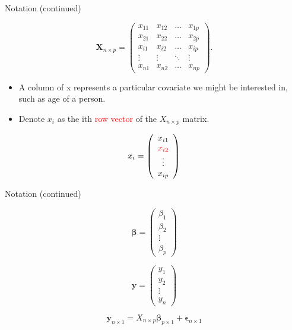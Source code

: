\documentclass[
  ignorenonframetext,
]{beamer}
\newcommand{\by}   {\bm{y}}
\newcommand{\bbeta}{\bm{\beta}}
\begin{document}
\begin{frame}{Notation (continued)}
\protect\hypertarget{notation-continued}{}

\[\bm{X}_{n \times p} = 
\left( \begin{array}{cccc}
x_{11} & x_{12} & \ldots&  x_{1p}\\
x_{21} & x_{22} & \ldots& x_{2p} \\
x_{i1} & x_{i2} & \ldots& x_{ip} \\
\vdots & \vdots & \ddots & \vdots \\
x_{n1} & x_{n2} &\ldots& x_{np}
\end{array} \right).
\]

\begin{itemize}
\item
  A column of x represents a particular covariate we might be interested
  in, such as age of a person.
\item
  Denote \(x_i\) as the ith \textcolor{red}{row vector} of the
  \(X_{n \times p}\) matrix.
\end{itemize}

\[  x_{i}= \left( \begin{array}{c}
x_{i1}\\
\textcolor{red}{x_{i2}}\\
\vdots\\
x_{ip}
\end{array} \right) \]

\end{frame}

\begin{frame}{Notation (continued)}
\protect\hypertarget{notation-continued-1}{}

\[  \bbeta= \left( \begin{array}{c}
\beta_1\\
\beta_2\\
\vdots\\
\beta_p
\end{array} \right) \]

\[  \by= \left( \begin{array}{c}
y_1\\
y_2\\
\vdots\\
y_n
\end{array} \right) \]

\[\by_{n \times 1} = 
X_{n \times p} \bbeta_{p \times 1} + \bm{\epsilon}_{n \times 1}\]

\end{frame}
\end{document}
